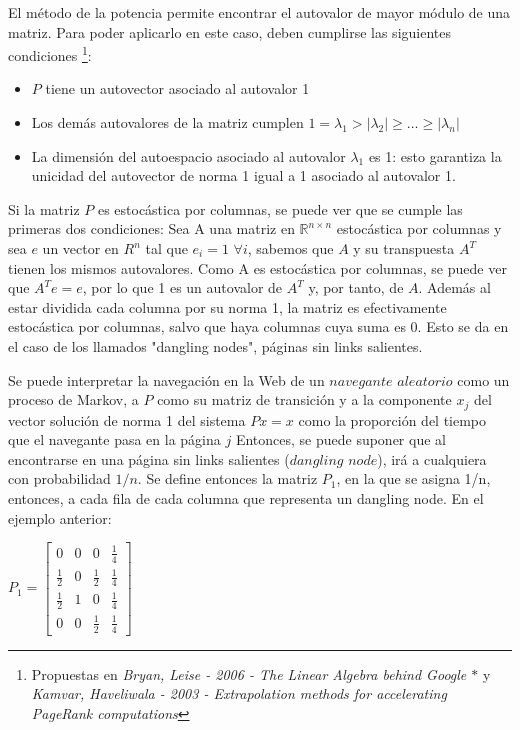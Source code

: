 \documentclass[a4paper]{article}
\begin{document}
El método de la potencia permite encontrar el autovalor de mayor módulo de una matriz. Para poder aplicarlo en este caso, deben cumplirse las siguientes condiciones \footnote {Propuestas en \textit{Bryan, Leise - 2006 - The Linear Algebra behind Google $\ast$} y \textit{Kamvar, Haveliwala - 2003 - Extrapolation methods for accelerating PageRank computations}}:
\begin{itemize}
\item $P$ tiene un autovector asociado al autovalor 1
\item Los demás autovalores de la matriz cumplen $1 = \lambda_1 > |\lambda_2| \geq \dots \geq |\lambda_n|$ 
\item La dimensión del autoespacio asociado al autovalor $\lambda_1$ es 1: esto garantiza la unicidad del autovector de norma 1 igual a 1 asociado al autovalor 1.
\end{itemize}

Si la matriz $P$ es estocástica por columnas, se puede ver que se cumple las primeras dos condiciones:
Sea A una matriz en $\mathbb{R}^{n \times n}$ estocástica por columnas y sea $e$ un vector en $R^n$ tal que $e_i=1$ $\forall i$,
sabemos que $A$ y su transpuesta $A^T$ tienen los mismos autovalores. Como A es estocástica por columnas, se puede ver que $A^T e = e$, por lo que 1 es un autovalor de $A^T$ y, por tanto, de $A$. Además al estar dividida cada columna por su norma 1, la matriz es efectivamente estocástica por columnas, salvo que haya columnas cuya suma es 0. Esto se da en el caso de los llamados "dangling nodes", páginas sin links salientes. 

Se puede interpretar la navegación en la Web de un $navegante$ $aleatorio$ como un proceso de Markov, a $P$ como su matriz de transición y a la componente $x_j$ del vector soluci\'on de norma 1 del sistema $Px = x$ como la proporci\'on del tiempo que el navegante pasa en la p\'agina $j$ Entonces, se puede suponer que al encontrarse en una página sin links salientes ($dangling$ $node$), irá a cualquiera con probabilidad $1/n$. Se define entonces la matriz $P_1$, en la que se asigna 1/n, entonces, a cada fila de cada columna que representa un dangling node. En el ejemplo anterior:
\begin{center}
$P_1= \begin{bmatrix} 0&0&0&\frac{1}{4}\\\frac{1}{2}&0&\frac{1}{2}&\frac{1}{4}\\\frac{1}{2}&1&0&\frac{1}{4}\\0&0&\frac{1}{2}&\frac{1}{4} \end{bmatrix} $
\end{center}
\end{document}
